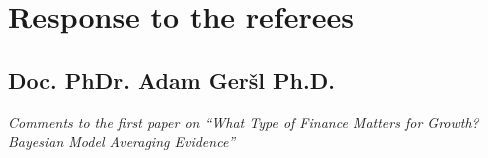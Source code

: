 \chapter{Response to the referees}
\section{Doc. PhDr. Adam Ger\v{s}l Ph.D.}

\textit{Comments to the first paper on ``What Type of Finance Matters for Growth? Bayesian Model Averaging Evidence''}




